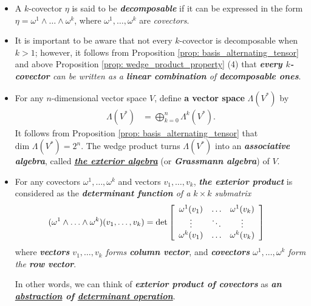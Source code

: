 \documentclass[11pt]{article}
\begin{document}
\begin{itemize}
\item \begin{definition}
A $k$-covector $\eta$ is said to be \emph{\textbf{decomposable}} if it can be expressed in the form $\eta = \omega^1 \wedge \ldots \wedge \omega^k$, where $\omega^1,\ldots, \omega^k$ are \emph{covectors}. 
\end{definition}

\item \begin{remark}
It is important to be aware that not every $k$-covector is decomposable when $k > 1$; however, it follows from Proposition \ref{prop: basis_alternating_tensor} and above Proposition \ref{prop: wedge_product_property} (4) that \emph{\textbf{every $k$-covector} can be written as a \textbf{linear combination} of \textbf{decomposable ones}}.
\end{remark}

\item \begin{definition}
For any $n$-dimensional vector space $V$, define \textbf{a vector space} $\Lambda(V^{*})$ by
\begin{align*}
\Lambda(V^{*}) &= \bigoplus_{k=0}^{n} \Lambda^k(V^{*}).
\end{align*}
It follows from Proposition \ref{prop: basis_alternating_tensor} that $\text{dim }\Lambda(V^{*}) = 2^n$. The wedge product turns $\Lambda(V^{*})$ into an \emph{\textbf{associative algebra}}, called \underline{\emph{\textbf{the exterior algebra}}} (or \emph{\textbf{Grassmann algebra}}) of $V$. 
\end{definition}

\item \begin{remark}
 For any covectors $\omega^1,\ldots, \omega^k$ and vectors $v_1,\ldots,v_k$, \emph{\textbf{the exterior product}} is considered as the \emph{\textbf{determinant function} of a $k \times k$ submatrix }
\begin{align*}
(\omega^1 \wedge \ldots \wedge \omega^k)(v_1,\ldots,v_k) &= \det\left[ \begin{array}{ccc}
\omega^{1}(v_1) & \ldots & \omega^{1}(v_k)\\
\vdots & \ddots & \vdots\\
\omega^{k}(v_1) & \ldots & \omega^{k}(v_k)
\end{array}\right] 
\end{align*} where \emph{\textbf{vectors} $v_1,\ldots,v_k$ forms \textbf{column vector}}, and \emph{\textbf{covectors} $\omega^1,\ldots, \omega^k$ form the \textbf{row vector}}.  

In other words, we can think of \emph{\textbf{exterior product of covectors}} as \emph{\textbf{an \underline{abstraction} of \underline{determinant operation}}}.
\end{remark}
\end{itemize}
\end{document}
